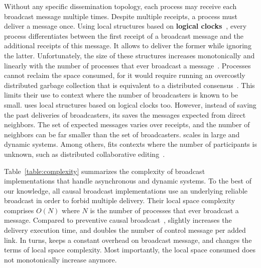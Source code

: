 Without any specific dissemination topology, each process may receive each
broadcast message multiple times. Despite multiple receipts, a process must
deliver a message once.  Using local structures based on \textbf{logical
  clocks~\cite{lamport1978time}}, every process differentiates between the first
receipt of a broadcast message and the additional receipts of this message. It
allows to deliver the former while ignoring the latter. Unfortunately, the size
of these structures increases monotonically and linearly with the number of
processes that ever broadcast a
message~\cite{malkhi2007concise,mukund2014optimized}.  Processes cannot reclaim
the space consumed, for it would require running an overcostly distributed
garbage collection that is equivalent to a distributed
consensus~\cite{abdullahi1998garbage}.  This limits their use to context where
the number of broadcasters is known to be small.  \RPCBROADCAST uses local
structures based on logical clocks too. However, instead of saving the past
deliveries of broadcasters, its saves the messages expected from direct
neighbors. The set of expected messages varies over receipts, and the number of
neighbors can be far smaller than the set of broadcasters. \RPCBROADCAST scales
in large and dynamic systems. Among others, \RPCBROADCAST fits contexts where
the number of participants is unknown, such as distributed collaborative
editing~\cite{nedelec2016crate}.

Table~\ref{table:complexity} summarizes the complexity of broadcast
implementations that handle asynchronous and dynamic systems. To the best of our
knowledge, all causal broadcast implementations use an underlying reliable
broadcast in order to forbid multiple delivery. Their local space complexity
comprises $O(N)$ where $N$ is the number of processes that ever broadcast a
message. Compared to preventive causal broadcast~\cite{nedelec2018pcbroadcast},
\RPCBROADCAST slightly increases the delivery execution time, and doubles the
number of control message per added link. In turns, \RPCBROADCAST keeps a
constant overhead on broadcast message, and changes the terms of local space
complexity. Most importantly, the local space consumed does not monotonically
increase anymore. 

